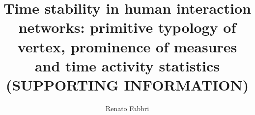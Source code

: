 \documentclass[%
 aip,
 jmp,%
 amsmath,amssymb,
 reprint,%
 floatfix,
]{revtex4-1}
\begin{document}

\title[Interaction networks stability: SUPPORTING INFORMATION]{Time stability in human interaction networks: primitive typology of vertex, prominence of measures and time activity statistics (SUPPORTING INFORMATION)}%

\author{Renato Fabbri}%

%
%
%

%

\end{document}
